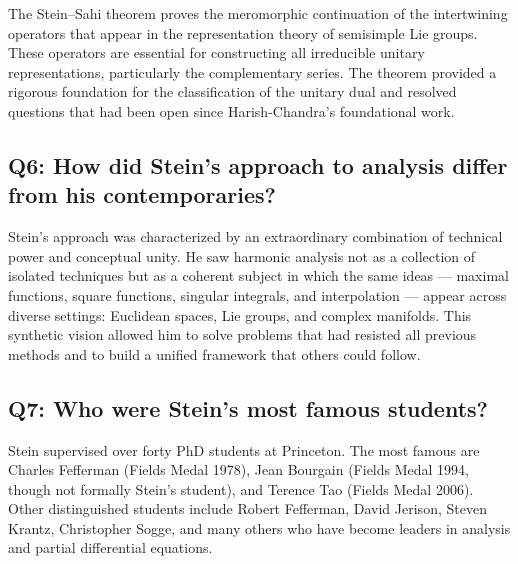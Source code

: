 The Stein--Sahi theorem proves the meromorphic continuation of the intertwining operators that appear in the representation theory of semisimple Lie groups. These operators are essential for constructing all irreducible unitary representations, particularly the complementary series. The theorem provided a rigorous foundation for the classification of the unitary dual and resolved questions that had been open since Harish-Chandra's foundational work.

\subsection*{Q6: How did Stein's approach to analysis differ from his contemporaries?}

Stein's approach was characterized by an extraordinary combination of technical power and conceptual unity. He saw harmonic analysis not as a collection of isolated techniques but as a coherent subject in which the same ideas --- maximal functions, square functions, singular integrals, and interpolation --- appear across diverse settings: Euclidean spaces, Lie groups, and complex manifolds. This synthetic vision allowed him to solve problems that had resisted all previous methods and to build a unified framework that others could follow.

\subsection*{Q7: Who were Stein's most famous students?}

Stein supervised over forty PhD students at Princeton. The most famous are Charles Fefferman (Fields Medal 1978), Jean Bourgain (Fields Medal 1994, though not formally Stein's student), and Terence Tao (Fields Medal 2006). Other distinguished students include Robert Fefferman, David Jerison, Steven Krantz, Christopher Sogge, and many others who have become leaders in analysis and partial differential equations.

